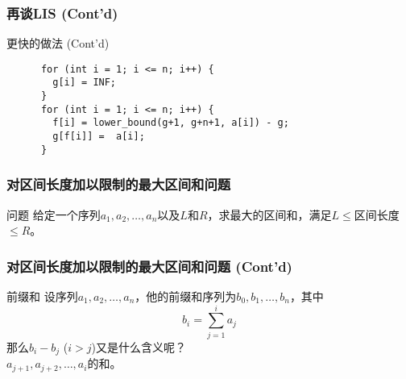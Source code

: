 \documentclass[hyperref={unicode=true}]{beamer}
\theoremstyle{definition}
\theoremstyle{proof}
\begin{document}
\begin{frame}[fragile]\frametitle{再谈LIS (Cont'd)}
  \begin{exampleblock}{更快的做法 (Cont'd)}
    \begin{verbatim}
      for (int i = 1; i <= n; i++) {
        g[i] = INF;
      }
      for (int i = 1; i <= n; i++) {
        f[i] = lower_bound(g+1, g+n+1, a[i]) - g;
        g[f[i]] =  a[i];
      }
    \end{verbatim}
  \end{exampleblock}
\end{frame}

\begin{frame}\frametitle{对区间长度加以限制的最大区间和问题}
  \begin{block}{问题}
    给定一个序列$a_1,a_2,\ldots,a_n$以及$L$和$R$，求最大的区间和，满足$L\leq$区间长度$\leq R$。
  \end{block}
\end{frame}

\begin{frame}\frametitle{对区间长度加以限制的最大区间和问题 (Cont'd)}
  \begin{alertblock}{前缀和}
    设序列$a_1,a_2,\ldots,a_n$，他的前缀和序列为$b_0,b_1,\ldots,b_n$，其中
    \[b_i=\sum_{j=1}^i a_j\]
    那么$b_i-b_j$ ($i>j$)又是什么含义呢？\\
    \pause{}$a_{j+1},a_{j+2},\ldots,a_i$的和。
  \end{alertblock}
\end{frame}
\end{document}
